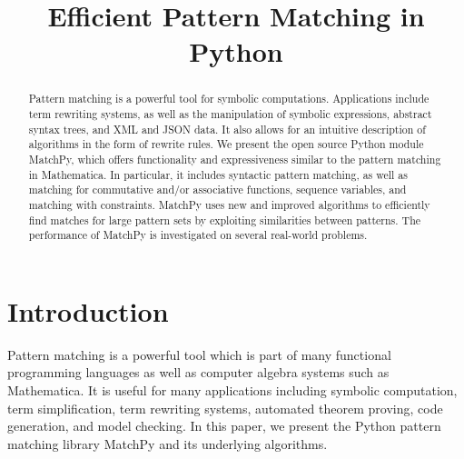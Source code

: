 \documentclass[conference,compsoc]{IEEEtran}
\begin{document}
\title{Efficient Pattern Matching in Python}

\author{
}

\maketitle


\begin{abstract}
Pattern matching is a powerful tool for symbolic computations.
Applications include term rewriting systems, as well as the manipulation of symbolic expressions, abstract syntax trees, and XML and JSON data. It also allows for an intuitive description of algorithms in the form of rewrite rules.
We present the open source Python module MatchPy, which offers functionality
and expressiveness similar to the pattern matching in Mathematica.
In particular, it includes syntactic pattern matching, as well as matching
for commutative and/or associative functions, sequence variables, and matching with constraints.
MatchPy uses new and improved algorithms to efficiently find matches for large pattern sets by exploiting similarities between patterns.
The performance of MatchPy is investigated on several real-world problems.
\end{abstract}

\IEEEpeerreviewmaketitle

\section{Introduction}

Pattern matching is a powerful tool which is part of many functional programming
languages as well as computer algebra systems such as Mathematica.
It is useful for many applications including symbolic computation, term simplification,
term rewriting systems, automated theorem proving, code generation, and model checking.
In this paper, we present the Python pattern matching library MatchPy \cite{MatchPy} and its underlying algorithms.
\end{document}
